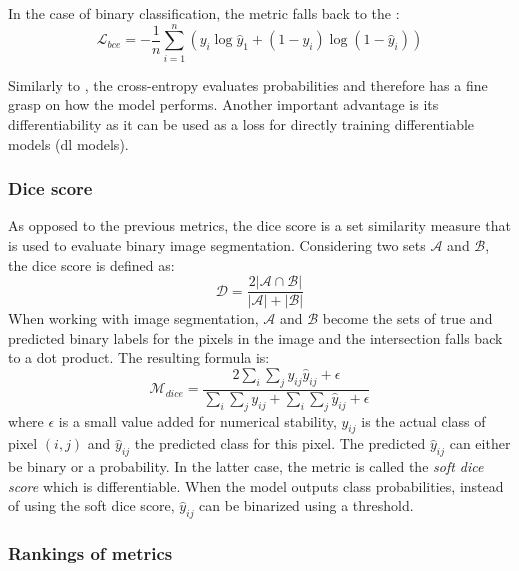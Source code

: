 In the case of binary classification, the metric falls back to the :
\begin{equation}
\label{eqn:backml:bce}
\mathcal{L}_{bce} = - \frac{1}{n} \sum\limits_{i=1}^n \left(y_i \log \hat{y}_1 + (1 - y_i) \log (1 - \hat{y}_i)\right) 
\end{equation} 

Similarly to \rocauc, the cross-entropy evaluates probabilities and therefore has a fine grasp on how the model performs. Another important advantage is its differentiability as it can be used as a loss for directly training differentiable models (\eg \acrlong{dl} models).

\subsubsection{Dice score}
\label{sssec:backml:metric:dice}

As opposed to the previous metrics, the dice score is a set similarity measure that is used to evaluate binary image segmentation. Considering two sets $\mathcal{A}$ and $\mathcal{B}$, the dice score is defined as:
\begin{equation}
\label{eqn:backml:diceAB}
\mathcal{D} = \frac{2 \left|\mathcal{A}\cap \mathcal{B}\right|}{\left|\mathcal{A}\right| + \left|\mathcal{B}\right|}
\end{equation}
When working with image segmentation, $\mathcal{A}$ and $\mathcal{B}$ become the sets of true and predicted binary labels for the pixels in the image and the intersection falls back to a dot product. The resulting formula is:
\begin{equation}
\label{eqn:backml:dice}
\mathcal{M}_{dice} = \dfrac{2 \sum_i\sum_j y_{ij} \hat{y}_{ij} + \epsilon}{\sum_i\sum_j y_{ij} + \sum_i\sum_j \hat{y}_{ij} + \epsilon}
\end{equation}
where $\epsilon$ is a small value added for numerical stability, $y_{ij}$ is the actual class of pixel $(i, j)$ and $\hat{y}_{ij}$ the predicted class for this pixel. The predicted $\hat{y}_{ij}$ can either be binary or a probability. In the latter case, the metric is called the \textit{soft dice score} which is differentiable. When the model outputs class probabilities, instead of using the soft dice score, $\hat{y}_{ij}$ can be binarized using a threshold. 

\subsubsection{Rankings of metrics}
\label{ssec:backml:metric:rankings}

